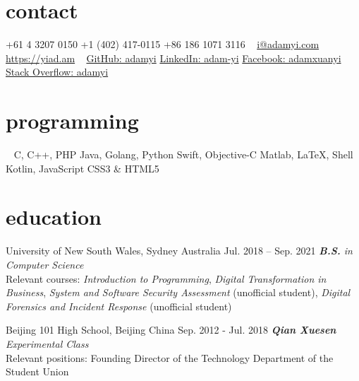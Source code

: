 \documentclass[hidelinks__VERSION__]{adamyi-cv}
\begin{document}



\begin{aside} %
\section{contact}
+61 4 3207 0150
+1 (402) 417-0115
+86 186 1071 3116
~
\href{mailto:i@adamyi.com}{i@adamyi.com}
\href{https://yiad.am}{https://yiad.am}
~
\href{https://github.com/adamyi}{GitHub: adamyi}
\href{https://www.linkedin.com/in/adam-yi/}{LinkedIn: adam-yi}
\href{https://www.facebook.com/adamxuanyi}{Facebook: adamxuanyi}
\href{https://stackoverflow.com/users/6482303/adamyi}{Stack Overflow: adamyi}
\section{programming}
~
C, C++, PHP
Java, Golang, Python
Swift, Objective-C
Matlab, \LaTeX, Shell
Kotlin, JavaScript
CSS3 \& HTML5
\versionsection
\end{aside}


\section{education}

\begin{entrylist}


\entry
{University of New South Wales, Sydney Australia}
{Jul. 2018 -- Sep. 2021}
{\emph{\textbf{B.S.} in Computer Science}\\
Relevant courses: \emph{Introduction to Programming}, \emph{Digital Transformation in Business}, \emph{System and Software Security Assessment} (unofficial student), \emph{Digital Forensics and Incident Response} (unofficial student)
}

\entry
{Beijing 101 High School, Beijing China}
{Sep. 2012 - Jul. 2018}
{\emph{\textbf{Qian Xuesen} Experimental Class}\\
Relevant positions: Founding Director of the Technology Department of the Student Union
}

\end{entrylist}
\end{document}
